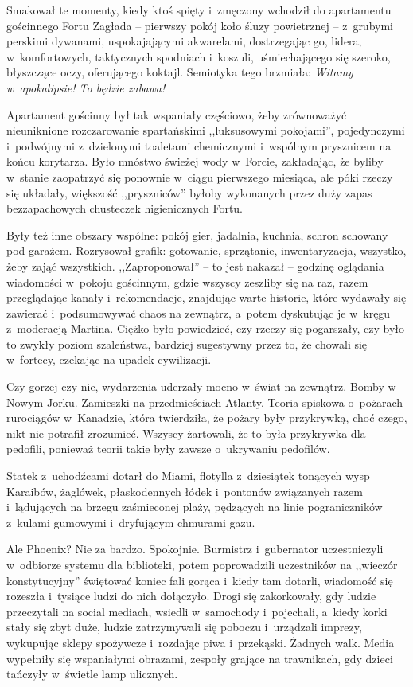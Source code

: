 \documentclass[oneside,polish,11pt,sfheadings]{mwbk}
\begin{document}
Smakował te momenty, kiedy ktoś spięty i~zmęczony wchodził do
apartamentu gościnnego Fortu Zagłada -- pierwszy pokój koło śluzy
powietrznej -- z~grubymi perskimi dywanami, uspokajającymi akwarelami,
dostrzegając go, lidera, w~komfortowych, taktycznych spodniach i~koszuli, uśmiechającego się szeroko, błyszczące oczy, oferującego
koktajl. Semiotyka tego brzmiała: \textit{Witamy w~apokalipsie! To będzie
zabawa!}

Apartament gościnny był tak wspaniały częściowo, żeby zrównoważyć
nieuniknione rozczarowanie spartańskimi ,,luksusowymi pokojami'',
pojedynczymi i~podwójnymi z~dzielonymi toaletami chemicznymi i~wspólnym
prysznicem na końcu korytarza. Było mnóstwo świeżej wody w~Forcie,
zakładając, że byliby w~stanie zaopatrzyć się ponownie w~ciągu
pierwszego miesiąca, ale póki rzeczy się układały, większość
,,pryszniców'' byłoby wykonanych przez duży zapas bezzapachowych
chusteczek higienicznych Fortu.

Były też inne obszary wspólne: pokój gier, jadalnia, kuchnia, schron
schowany pod garażem. Rozrysował grafik: gotowanie, sprzątanie,
inwentaryzacja, wszystko, żeby zająć wszystkich. ,,Zaproponował'' -- to
jest nakazał -- godzinę oglądania wiadomości w~pokoju gościnnym, gdzie
wszyscy zeszliby się na raz, razem przeglądając kanały i~rekomendacje,
znajdując warte historie, które wydawały się zawierać i~podsumowywać
chaos na zewnątrz, a~potem dyskutując je w~kręgu z~moderacją Martina.
Ciężko było powiedzieć, czy rzeczy się pogarszały, czy było to zwykły
poziom szaleństwa, bardziej sugestywny przez to, że chowali się w~fortecy, czekając na upadek cywilizacji.

Czy gorzej czy nie, wydarzenia uderzały mocno w~świat na zewnątrz. Bomby
w Nowym Jorku. Zamieszki na przedmieściach Atlanty. Teoria spiskowa o~pożarach rurociągów w~Kanadzie, która twierdziła, że pożary były
przykrywką, choć czego, nikt nie potrafił zrozumieć. Wszyscy żartowali,
że to była przykrywka dla pedofili, ponieważ teorii takie były zawsze o~ukrywaniu pedofilów.

Statek z~uchodźcami dotarł do Miami, flotylla z~dziesiątek tonących wysp
Karaibów, żaglówek, płaskodennych łódek i~pontonów związanych razem i~lądujących na brzegu zaśmieconej plaży, pędzących na linie
pograniczników z~kulami gumowymi i~dryfującym chmurami gazu.

Ale Phoenix? Nie za bardzo. Spokojnie. Burmistrz i~gubernator
uczestniczyli w~odbiorze systemu dla biblioteki, potem poprowadzili
uczestników na ,,wieczór konstytucyjny'' świętować koniec fali gorąca i~kiedy tam dotarli, wiadomość się rozeszła i~tysiące ludzi do nich
dołączyło. Drogi się zakorkowały, gdy ludzie przeczytali na social
mediach, wsiedli w~samochody i~pojechali, a~kiedy korki stały się zbyt
duże, ludzie zatrzymywali się poboczu i~urządzali imprezy, wykupując
sklepy spożywcze i~rozdając piwa i~przekąski. Żadnych walk. Media
wypełniły się wspaniałymi obrazami, zespoły grające na trawnikach, gdy
dzieci tańczyły w~świetle lamp ulicznych.
\end{document}
